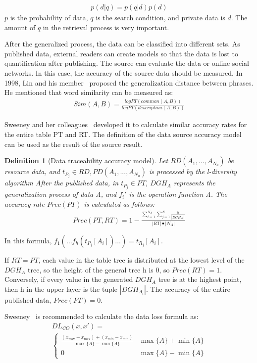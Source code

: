 \documentclass[journal,transmag]{IEEEtran}
\newtheorem{definition}{Definition}
\begin{document}
\begin{eqnarray}
p(d|q)=p (q|d)p (d)
\end{eqnarray}
$ p $ is the probability of data, $ q $ is the search condition, and private data is $d$. The amount of $q$ in the retrieval process is very important.

After the generalized process, the data can be classified into different sets. As published data, external readers can create models so that the data is lost to quantification after publishing. The source can evaluate the data or online social networks. In this case, the accuracy of the source data should be measured. In 1998, Lin and his member~\cite{lin1998information} proposed the generalization distance between phrases. He mentioned that word similarity can be measured as:
\begin{eqnarray}
Sim (A, B)=\frac{log PT (common (A, B))}{log PT (description (A, B))}
\end{eqnarray}

Sweeney and her colleagues~\cite{sweeney2002achieving} developed it to calculate similar accuracy rates for the entire table PT and RT. The definition of the data source accuracy model can be used as the result of the source result.


\begin{definition}[Data traceability accuracy model]\label{def9} 
Let $RD (A_1, ..., A_{N_a})$ be resource data, and $t_{P_j} \in RD, PD (A_1, ..., A_{N_a})$ is processed by the l-diversity algorithm After the published data, in $t_{P_j}\in PT$, $DGH_A$ represents the generalization process of data A, and $f_i'$ is the operation function A. The accuracy rate $Prec (PT)$ is calculated as follows:
	\begin{eqnarray}
	Prec (PT, RT)=1-\frac{\sum_{i=1}^{N_A} \sum_{j=1}^N \frac{h}{|DGH_{A_i}|}}{|RT|\bullet|N_A|}
	\end{eqnarray}
\end{definition}

In this formula, $f_1 (\dots f_h (t_{P_j} [A_i ])\dots )=t_{R_j} [A_i]$.

If $ RT = PT $, each value in the table tree is distributed at the lowest level of the $ DGH_A $ tree, so the height of the general tree h is 0, so $ Prec (RT) = 1 $. Conversely, if every value in the generated $ DGH_A $ tree is at the highest point, then h in the upper layer is the tuple $ | DGH_ {A_i} | $. The accuracy of the entire published data, $Prec (PT)=0$.


Sweeney~\cite{sweeney2002achieving} is recommended to calculate the data loss formula as:
\begin{equation}
\begin{array}{ll}
DL_{CO} (x, x')= \\
\left\{
\begin{array}{ll}
\frac{\left(x_{\max }-x_{\max }\right)+\left(x_{\min }-x_{\min }\right)}{\max \{A\}-\min \{A\}} & \max \{A\}+\min \{A\} \\
0 & \max \{A\}-\min \{A\}
\end{array}
\right.
\end{array}
\end{equation}
\end{document}
